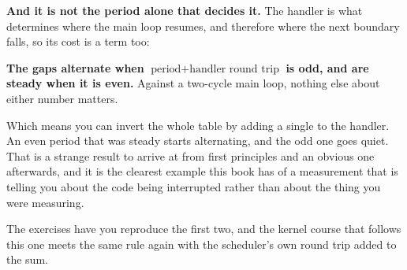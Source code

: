 \textbf{And it is not the period alone that decides it.} The handler is what determines where the
main loop resumes, and therefore where the next boundary falls, so its cost is a term too:

\begin{aside}
\textbf{The gaps alternate when $\text{period} + \text{handler round trip}$ is odd, and are steady
when it is even.} Against a two-cycle main loop, nothing else about either number matters.
\end{aside}

Which means you can invert the whole table by adding a single  to the handler. An even
period that was steady starts alternating, and the odd one goes quiet. That is a strange result to
arrive at from first principles and an obvious one afterwards, and it is the clearest example this
book has of a measurement that is telling you about the code being interrupted rather than about
the thing you were measuring.

The exercises have you reproduce the first two, and the kernel course that follows this one meets
the same rule again with the scheduler's own round trip added to the sum.
